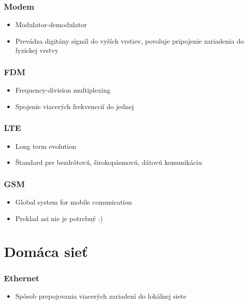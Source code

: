 \documentclass[10pt,xcolor=pdflatex,hyperref={unicode}]{beamer}
\begin{document}
    \begin{frame}
        \frametitle{Modem}
        \begin{itemize}
            \item Modulator-demodulator
            \item Prevádza digitány signál do vyších vrstiev, povoluje pripojenie zariadenia do fyzickej vrstvy
        \end{itemize}
    \end{frame}

    \begin{frame}
        \frametitle{FDM}
        \begin{itemize}
            \item Frequency-division multiplexing
            \item Spojenie viacerých frekvenccií do jednej
        \end{itemize}
    \end{frame}

    \begin{frame}
        \frametitle{LTE}
        \begin{itemize}
            \item Long term evolution
            \item Štandard pre bezdrôtovú, širokopásmovú, dátovú komunikáciu
        \end{itemize}
    \end{frame}

    \begin{frame}
        \frametitle{GSM}
        \begin{itemize}
            \item Global system for mobile comunication
            \item Preklad asi nie je potrebný :)
        \end{itemize}
    \end{frame}


    \section{Domáca sieť}
    \begin{frame}
        \frametitle{Ethernet}
        \begin{itemize}
            \item Spôsob prepojovania viacerých zariadení do lokálnej siete
        \end{itemize}
    \end{frame}
\end{document}
